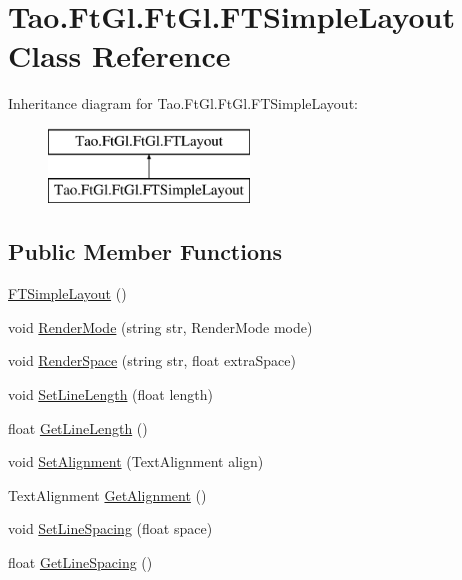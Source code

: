 \hypertarget{class_tao_1_1_ft_gl_1_1_ft_gl_1_1_f_t_simple_layout}{
\section{Tao.FtGl.FtGl.FTSimpleLayout Class Reference}
\label{class_tao_1_1_ft_gl_1_1_ft_gl_1_1_f_t_simple_layout}
}
Inheritance diagram for Tao.FtGl.FtGl.FTSimpleLayout:\begin{figure}[H]
\begin{center}
\leavevmode
\includegraphics[height=2.000000cm]{class_tao_1_1_ft_gl_1_1_ft_gl_1_1_f_t_simple_layout}
\end{center}
\end{figure}
\subsection*{Public Member Functions}
\begin{DoxyCompactItemize}
\item 
\hyperlink{class_tao_1_1_ft_gl_1_1_ft_gl_1_1_f_t_simple_layout_a5e98312d61a7a7030a9a0d5e0e277152}{FTSimpleLayout} ()
\item 
void \hyperlink{class_tao_1_1_ft_gl_1_1_ft_gl_1_1_f_t_simple_layout_aa1d78c6b160258f71d6dd9926bae9b23}{RenderMode} (string str, RenderMode mode)
\item 
void \hyperlink{class_tao_1_1_ft_gl_1_1_ft_gl_1_1_f_t_simple_layout_a6ec1bd26d1c295839fc7660078770391}{RenderSpace} (string str, float extraSpace)
\item 
void \hyperlink{class_tao_1_1_ft_gl_1_1_ft_gl_1_1_f_t_simple_layout_a1370d7b01b06e5528c4c95cafac449d6}{SetLineLength} (float length)
\item 
float \hyperlink{class_tao_1_1_ft_gl_1_1_ft_gl_1_1_f_t_simple_layout_ad8d81fc78c656c864706c83e3783e11f}{GetLineLength} ()
\item 
void \hyperlink{class_tao_1_1_ft_gl_1_1_ft_gl_1_1_f_t_simple_layout_ab91333281e3dc72af78f8a5e2f407325}{SetAlignment} (TextAlignment align)
\item 
TextAlignment \hyperlink{class_tao_1_1_ft_gl_1_1_ft_gl_1_1_f_t_simple_layout_ab067650c63901f484272f11f97edf272}{GetAlignment} ()
\item 
void \hyperlink{class_tao_1_1_ft_gl_1_1_ft_gl_1_1_f_t_simple_layout_a8058c16ce6303c856bd557d453435ad0}{SetLineSpacing} (float space)
\item 
float \hyperlink{class_tao_1_1_ft_gl_1_1_ft_gl_1_1_f_t_simple_layout_ac0b83f6353e47f5a0a87ecf5ae98322d}{GetLineSpacing} ()
\end{DoxyCompactItemize}


